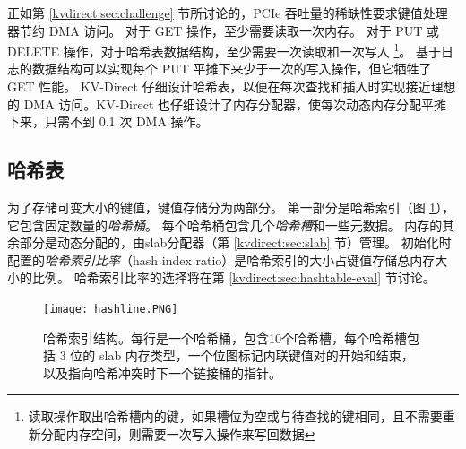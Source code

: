 正如第 \ref {kvdirect:sec:challenge} 节所讨论的，PCIe 吞吐量的稀缺性要求键值处理器节约 DMA 访问。
对于 GET 操作，至少需要读取一次内存。
对于 PUT 或 DELETE 操作，对于哈希表数据结构，至少需要一次读取和一次写入 \footnote{读取操作取出哈希槽内的键，如果槽位为空或与待查找的键相同，且不需要重新分配内存空间，则需要一次写入操作来写回数据}。
基于日志的数据结构可以实现每个 PUT 平摊下来少于一次的写入操作，但它牺牲了 GET 性能。
KV-Direct 仔细设计哈希表，以便在每次查找和插入时实现接近理想的 DMA 访问。KV-Direct 也仔细设计了内存分配器，使每次动态内存分配平摊下来，只需不到 0.1 次 DMA 操作。

\subsection{哈希表}
\label{kvdirect:sec:hashtable}

为了存储可变大小的键值，键值存储分为两部分。 第一部分是哈希索引（图 \ref {kvdirect:fig:hashtable}），它包含固定数量的\textit {哈希桶}。 每个哈希桶包含几个\textit {哈希槽}和一些元数据。 内存的其余部分是动态分配的，由slab分配器（第 \ref {kvdirect:sec:slab} 节）管理。
初始化时配置的\textit {哈希索引比率}（hash index ratio）是哈希索引的大小占键值存储总内存大小的比例。
哈希索引比率的选择将在第 \ref {kvdirect:sec:hashtable-eval} 节讨论。


\begin{figure}[htbp]
	\centering
	\texttt{[image: hashline.PNG]}
	\caption{哈希索引结构。每行是一个哈希桶，包含10个哈希槽，每个哈希槽包括 3 位的 slab 内存类型，一个位图标记内联键值对的开始和结束，以及指向哈希冲突时下一个链接桶的指针。}
	\label{kvdirect:fig:hashtable}
\end{figure}



